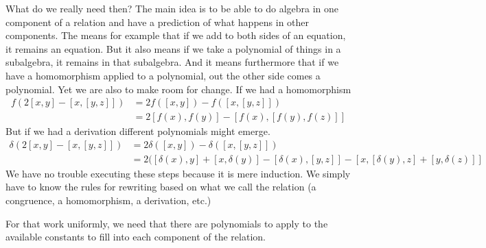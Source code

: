 What do we really need then?  The main idea is to be able to do 
algebra in one component of a relation and have a prediction of 
what happens in other components.  The means for example that 
if we add to both sides of an equation, it remains an equation.
But it also means if we take a polynomial of things in a subalgebra,
it remains in that subalgebra.  And it means furthermore that 
if we have a homomorphism applied to a polynomial, out the other 
side comes a polynomial.  Yet we are also to make room for change.
If we had a homomorphism
\begin{align*}
    f(2[x,y]-[x,[y,z]]) & = 
    2f([x,y])-f([x,[y,z]])\\
    & = 2[f(x),f(y)]-[f(x),[f(y),f(z)]]
\end{align*}
But if we had a derivation different polynomials might emerge.
\begin{align*}
    \delta(2[x,y]-[x,[y,z]]) & = 
    2\delta([x,y])-\delta([x,[y,z]])\\
    & = 2([\delta(x),y]+[x,\delta(y)]-[\delta(x),[y,z]]
    -[x,[\delta(y),z]+[y,\delta(z)]]
\end{align*}
We have no trouble executing these steps because it is 
mere induction.  We simply have to know the rules for 
rewriting based on what we call the relation (a congruence,
a homomorphism, a derivation, etc.)

For that work uniformly, we need 
that there are polynomials to apply to the available constants to fill 
into each component of the relation.